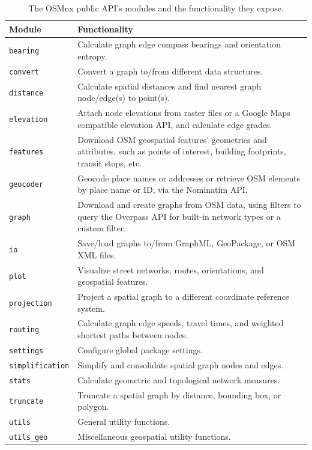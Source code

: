 \documentclass[12pt,letterpaper]{article} %
\begin{document}
\begin{table}[htbp]
    \centering
    \caption{The OSMnx public API's modules and the functionality they expose.}\label{tab:osmnx_modules}
    \begin{tabular}{lp{10cm}}
        \toprule
        Module &  Functionality \\
        \midrule
        \texttt{bearing}  & Calculate graph edge compass bearings and orientation entropy.\\
        \texttt{convert}  & Convert a graph to/from different data structures.\\
        \texttt{distance}  & Calculate spatial distances and find nearest graph node/edge(s) to point(s).\\
        \texttt{elevation}  &  Attach node elevations from raster files or a Google Maps compatible elevation API, and calculate edge grades.\\
        \texttt{features}  &  Download OSM geospatial features' geometries and attributes, such as points of interest, building footprints, transit stops, etc.\\
        \texttt{geocoder}  & Geocode place names or addresses or retrieve OSM elements by place name or ID, via the Nominatim API.\\
        \texttt{graph}  & Download and create graphs from OSM data, using filters to query the Overpass API for built-in network types or a custom filter.\\
        \texttt{io}  & Save/load graphs to/from GraphML, GeoPackage, or OSM XML files.\\
        \texttt{plot} & Visualize street networks, routes, orientations, and geospatial features.  \\
        \texttt{projection}  &  Project a spatial graph to a different coordinate reference system.\\
        \texttt{routing}  &  Calculate graph edge speeds, travel times, and weighted shortest paths between nodes.\\
        \texttt{settings}  & Configure global package settings.\\
        \texttt{simplification}  & Simplify and consolidate spatial graph nodes and edges.\\
        \texttt{stats}  &  Calculate geometric and topological network measures.\\
        \texttt{truncate}  & Truncate a spatial graph by distance, bounding box, or polygon.\\
        \texttt{utils}  & General utility functions.\\
        \texttt{utils\_geo}  & Miscellaneous geospatial utility functions.\\
        \bottomrule
    \end{tabular}
\end{table}
\end{document}
